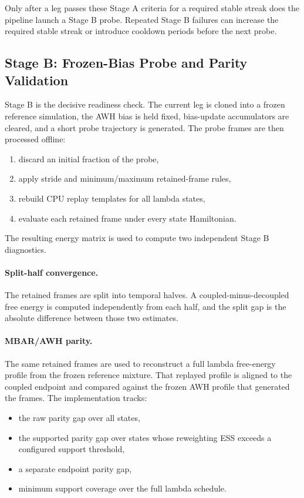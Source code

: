 Only after a leg passes these Stage A criteria for a required stable streak does the pipeline launch a Stage B probe. Repeated Stage B failures can increase the required stable streak or introduce cooldown periods before the next probe.

\subsection{Stage B: Frozen-Bias Probe and Parity Validation}

Stage B is the decisive readiness check. The current leg is cloned into a frozen reference simulation, the AWH bias is held fixed, bias-update accumulators are cleared, and a short probe trajectory is generated. The probe frames are then processed offline:

\begin{enumerate}
    \item discard an initial fraction of the probe,
    \item apply stride and minimum/maximum retained-frame rules,
    \item rebuild CPU replay templates for all lambda states,
    \item evaluate each retained frame under every state Hamiltonian.
\end{enumerate}

The resulting energy matrix is used to compute two independent Stage B diagnostics.

\paragraph{Split-half convergence.}

The retained frames are split into temporal halves. A coupled-minus-decoupled free energy is computed independently from each half, and the split gap is the absolute difference between those two estimates.

\paragraph{MBAR/AWH parity.} 

The same retained frames are used to reconstruct a full lambda free-energy profile from the frozen reference mixture. That replayed profile is aligned to the coupled endpoint and compared against the frozen AWH profile that generated the frames. The implementation tracks:

\begin{itemize}
    \item the raw parity gap over all states,
    \item the supported parity gap over states whose reweighting ESS exceeds a     configured support threshold,
    \item a separate endpoint parity gap,
    \item minimum support coverage over the full lambda schedule.
\end{itemize}

